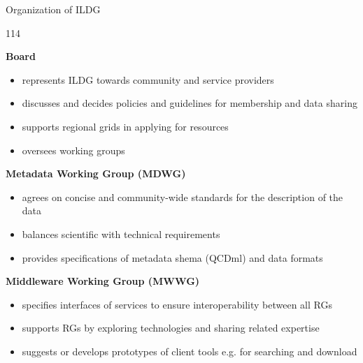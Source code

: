 \documentclass[aspectratio=169,xcolor=dvipsnames]{beamer}
\newcommand{\bi}{\begin{itemize}}
\newcommand{\ei}{\end{itemize}}
\begin{document}
\begin{frame}{Organization of ILDG}
  \begin{dinglist}{114}
    \item {\bf  Board}
    \bi
    \item represents ILDG towards community and service providers
    \item discusses and decides policies and guidelines for membership and data sharing
    \item supports regional grids in applying for resources
    \item oversees working groups
    \ei
  \item {\bf Metadata Working Group (MDWG)} \\
    \bi
    \item agrees on concise and community-wide standards for the description of the data
    \item balances scientific with technical requirements
    \item provides specifications of metadata shema (QCDml) and data formats 
    \ei
  \item {\bf Middleware Working Group (MWWG)} \\
    \bi
    \item specifies interfaces of services to ensure interoperability between all RGs 
    \item supports RGs by exploring technologies and sharing related expertise
    \item suggests or develops prototypes of client tools e.g. for searching and download
    \ei

  \end{dinglist}    

\end{frame}
\end{document}
